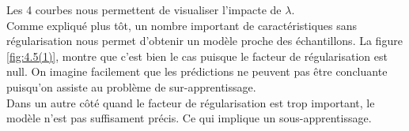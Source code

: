 Les 4 courbes nous permettent de visualiser l'impacte de $\lambda$. \\
Comme expliqué plus tôt, un nombre important de caractéristiques sans régularisation nous permet d'obtenir un modèle proche des échantillons. La figure \ref{fig:4.5(1)}, montre que c'est bien le 
cas puisque le facteur de régularisation est null. On imagine facilement que les prédictions ne peuvent pas être concluante puisqu'on assiste au problème de sur-apprentissage. \\
Dans un autre côté quand le facteur de régularisation est trop important, le modèle n'est pas suffisament précis. Ce qui implique un sous-apprentissage.
